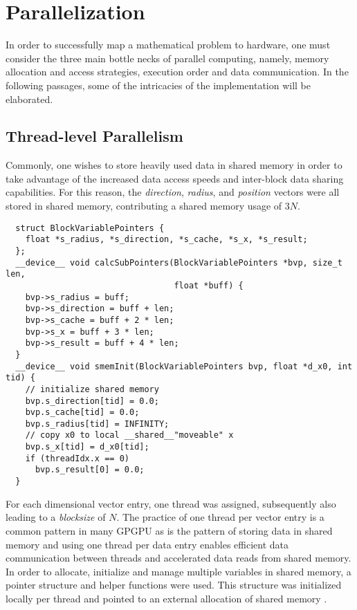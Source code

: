 \section{Parallelization}
In order to successfully map a mathematical problem to hardware, one must
consider the three main bottle necks of parallel computing, namely,
memory allocation and access strategies, execution order and data communication.
In the following passages, some of the intricacies of the implementation will be
elaborated.

\subsection{Thread-level Parallelism}\label{tlp}
Commonly, one wishes to store heavily used data in shared memory in order to
take advantage of the increased data access speeds and inter-block data sharing
capabilities.  For this reason, the \textit{direction}, \textit{radius}, and \textit{position}
vectors were all stored in shared memory, contributing a shared memory usage of
$3N$.
\begin{listing}
 \label{BlockVariablePointers}
\begin{verbatim}
  struct BlockVariablePointers {
    float *s_radius, *s_direction, *s_cache, *s_x, *s_result;
  };
  __device__ void calcSubPointers(BlockVariablePointers *bvp, size_t len,
                                  float *buff) {
    bvp->s_radius = buff;
    bvp->s_direction = buff + len;
    bvp->s_cache = buff + 2 * len;
    bvp->s_x = buff + 3 * len;
    bvp->s_result = buff + 4 * len;
  }
  __device__ void smemInit(BlockVariablePointers bvp, float *d_x0, int tid) {
    // initialize shared memory
    bvp.s_direction[tid] = 0.0;
    bvp.s_cache[tid] = 0.0;
    bvp.s_radius[tid] = INFINITY;
    // copy x0 to local __shared__"moveable" x
    bvp.s_x[tid] = d_x0[tid];
    if (threadIdx.x == 0)
      bvp.s_result[0] = 0.0;
  }
\end{verbatim}
\end{listing}

For each dimensional vector entry, one thread was assigned, subsequently
also leading to a \textit{blocksize} of $N$.  The practice of one thread per vector
entry is a common pattern in many \gls{GPGPU} as is the pattern of storing data in shared
memory and using one thread per data entry enables efficient data communication
between threads and accelerated data reads from shared memory. In order to allocate,
 initialize and manage multiple variables in shared memory, a pointer structure and helper functions
were used.  This structure was initialized locally per thread and pointed to an
external allocation of shared memory .

